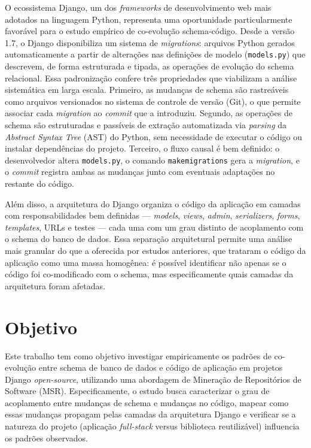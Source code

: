 \documentclass[
  12pt,
  openright,
  oneside,
  a4paper,
  brazil
]{abntex2}
\begin{document}
O ecossistema Django, um dos \textit{frameworks} de desenvolvimento web mais adotados na linguagem Python, representa uma oportunidade particularmente favorável para o estudo empírico de co-evolução schema-código. Desde a versão 1.7, o Django disponibiliza um sistema de \textit{migrations}: arquivos Python gerados automaticamente a partir de alterações nas definições de modelo (\texttt{models.py}) que descrevem, de forma estruturada e tipada, as operações de evolução do schema relacional. Essa padronização confere três propriedades que viabilizam a análise sistemática em larga escala. Primeiro, as mudanças de schema são rastreáveis como arquivos versionados no sistema de controle de versão (Git), o que permite associar cada \textit{migration} ao \textit{commit} que a introduziu. Segundo, as operações de schema são estruturadas e passíveis de extração automatizada via \textit{parsing} da \textit{Abstract Syntax Tree} (AST) do Python, sem necessidade de executar o código ou instalar dependências do projeto. Terceiro, o fluxo causal é bem definido: o desenvolvedor altera \texttt{models.py}, o comando \texttt{makemigrations} gera a \textit{migration}, e o \textit{commit} registra ambas as mudanças junto com eventuais adaptações no restante do código.

Além disso, a arquitetura do Django organiza o código da aplicação em camadas com responsabilidades bem definidas --- \textit{models}, \textit{views}, \textit{admin}, \textit{serializers}, \textit{forms}, \textit{templates}, URLs e testes --- cada uma com um grau distinto de acoplamento com o schema do banco de dados. Essa separação arquitetural permite uma análise mais granular do que a oferecida por estudos anteriores, que trataram o código da aplicação como uma massa homogênea: é possível identificar não apenas se o código foi co-modificado com o schema, mas especificamente quais camadas da arquitetura foram afetadas.

\section{Objetivo}

Este trabalho tem como objetivo investigar empiricamente os padrões de co-evolução entre schema de banco de dados e código de aplicação em projetos Django \textit{open-source}, utilizando uma abordagem de Mineração de Repositórios de Software (MSR). Especificamente, o estudo busca caracterizar o grau de acoplamento entre mudanças de schema e mudanças no código, mapear como essas mudanças propagam pelas camadas da arquitetura Django e verificar se a natureza do projeto (aplicação \textit{full-stack} versus biblioteca reutilizável) influencia os padrões observados.
\end{document}
